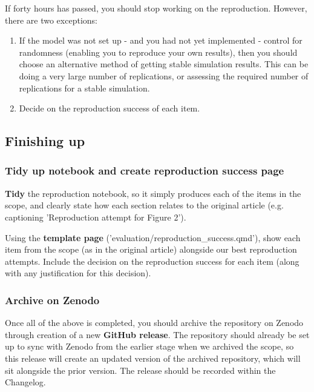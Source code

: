 If forty hours has passed, you should stop working on the reproduction. However, there are two exceptions:
\begin{enumerate}
    \item If the model was not set up - and you had not yet implemented - control for randomness (enabling you to reproduce your own results), then you should choose an alternative method of getting stable simulation results. This can be doing a very large number of replications, or assessing the required number of replications for a stable simulation.
    \item Decide on the reproduction success of each item.
\end{enumerate}

\vspace{0.5cm}
\subsection{Finishing up}

\subsubsection{Tidy up notebook and create reproduction success page}

\textbf{Tidy} the reproduction notebook, so it simply produces each of the items in the scope, and clearly state how each section relates to the original article (e.g. captioning 'Reproduction attempt for Figure 2').

Using the \textbf{template page} ('evaluation/reproduction\_success.qmd'), show each item from the scope (as in the original article) alongside our best reproduction attempts. Include the decision on the reproduction success for each item (along with any justification for this decision).

\vspace{0.5cm}
\subsubsection{Archive on Zenodo}

Once all of the above is completed, you should archive the repository on Zenodo through creation of a new \textbf{GitHub release}. The repository should already be set up to sync with Zenodo from the earlier stage when we archived the scope, so this release will create an updated version of the archived repository, which will sit alongside the prior version. The release should be recorded within the Changelog.